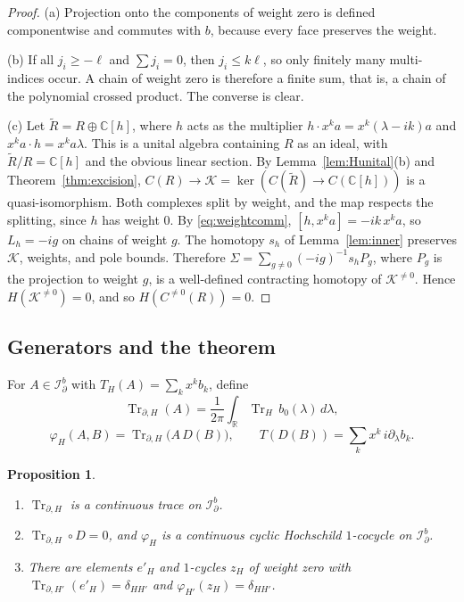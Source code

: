\documentclass[11pt,oneside,reqno]{article}
\newcommand{\C}{\mathbb C}
\DeclareMathOperator{\Tr}{Tr}
\newcommand{\Idb}{\mathcal I^b_\partial}
\theoremstyle{plain}
\newtheorem{proposition}[theorem]{Proposition}
\theoremstyle{definition}
\theoremstyle{remark}
\begin{document}
\begin{proof}
(a) Projection onto the components of weight zero is defined
componentwise and commutes with \(b\), because every face preserves the
weight.

(b) If all \(j_i\geq-\ell\) and \(\sum j_i=0\), then \(j_i\leq k\ell\), so
only finitely many multi-indices occur. A chain of weight zero is
therefore a finite sum, that is, a chain of the polynomial crossed product.
The converse is clear.

(c) Let \(\tilde R=R\oplus\C[h]\), where \(h\) acts as the multiplier
\(h\cdot x^ka=x^k(\lambda-ik)a\) and \(x^ka\cdot h=x^ka\lambda\). This is a
unital algebra containing \(R\) as an ideal, with \(\tilde R/R=\C[h]\) and
the obvious linear section. By Lemma~\ref{lem:Hunital}(b) and
Theorem~\ref{thm:excision}, \(C(R)\to\mathcal K=\ker(C(\tilde R)\to C(\C[h]))\)
is a quasi-isomorphism. Both complexes split by weight, and the map
respects the splitting, since \(h\) has weight \(0\). By
\eqref{eq:weightcomm}, \([h,x^ka]=-ik\,x^ka\), so \(L_h=-ig\) on chains of
weight \(g\). The homotopy \(s_h\) of Lemma~\ref{lem:inner} preserves
\(\mathcal K\), weights, and pole bounds. Therefore
\(\Sigma=\sum_{g\neq0}(-ig)^{-1}s_hP_g\), where \(P_g\) is the projection to
weight \(g\), is a well-defined contracting homotopy of
\(\mathcal K^{\neq0}\). Hence \(H(\mathcal K^{\neq0})=0\), and so
\(H(C^{\neq0}(R))=0\).
\end{proof}

\subsection{Generators and the theorem}
For \(A\in\Idb\) with \(T_H(A)=\sum_kx^kb_k\), define
\begin{equation}\label{eq:Trd}
 \Tr_{\partial,H}(A)=\frac1{2\pi}\int_{\mathbb R}\Tr_H\,b_0(\lambda)\,
 d\lambda ,
\end{equation}
\begin{equation}\label{eq:phi}
 \varphi_H(A,B)=\Tr_{\partial,H}\bigl(A\,D(B)\bigr),\qquad
 T(D(B))=\sum_kx^k\,i\partial_\lambda b_k .
\end{equation}

\begin{proposition}\label{prop:generators}
\begin{enumerate}
\item[(a)] \(\Tr_{\partial,H}\) is a continuous trace on \(\Idb\).
\item[(b)] \(\Tr_{\partial,H}\circ D=0\), and \(\varphi_H\) is a continuous
cyclic Hochschild \(1\)-cocycle on \(\Idb\).
\item[(c)] There are elements \(e'_H\) and \(1\)-cycles \(z_H\) of weight
zero with \(\Tr_{\partial,H'}(e'_H)=\delta_{HH'}\) and
\(\varphi_{H'}(z_H)=\delta_{HH'}\).
\end{enumerate}
\end{proposition}
\end{document}
